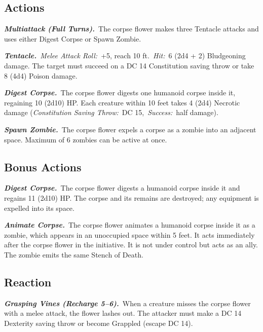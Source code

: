 \documentclass[10pt,twocolumn]{article}
\let\oldtextbf\textbf
\renewcommand{\textbf}[1]{\oldtextbf{{#1}}}
\begin{document}
\subsection{Actions}\label{actions-2}

\emph{\textbf{Multiattack (Full Turns).}}~The corpse flower makes three
Tentacle attacks and uses either Digest Corpse or Spawn Zombie.

\emph{\textbf{Tentacle.}}~\emph{Melee Attack Roll:}~+5, reach 10
ft.~\emph{Hit:}~6 (2d4 + 2) Bludgeoning damage. The target must succeed
on a DC 14 Constitution saving throw or take 8 (4d4) Poison damage.

\emph{\textbf{Digest Corpse.}}~The corpse flower digests one humanoid
corpse inside it, regaining 10 (2d10) HP. Each creature within 10 feet
takes 4 (2d4) Necrotic damage (\emph{Constitution Saving Throw:}~DC
15,~\emph{Success:}~half damage).

\emph{\textbf{Spawn Zombie.}}~The corpse flower expels a corpse as a
zombie into an adjacent space. Maximum of 6 zombies can be active at
once.

\subsection{Bonus Actions}\label{bonus-actions}

\emph{\textbf{Digest Corpse.}}~The corpse flower digests a humanoid
corpse inside it and regains 11 (2d10) HP. The corpse and its remains
are destroyed; any equipment is expelled into its space.

\emph{\textbf{Animate Corpse.}}~The corpse flower animates a humanoid
corpse inside it as a zombie, which appears in an unoccupied space
within 5 feet. It acts immediately after the corpse flower in the
initiative. It is not under control but acts as an ally. The zombie
emits the same Stench of Death.

\subsection{Reaction}\label{reaction}

\emph{\textbf{Grasping Vines (Recharge 5--6).}}~When a creature misses
the corpse flower with a melee attack, the flower lashes out. The
attacker must make a DC 14 Dexterity saving throw or become Grappled
(escape DC 14).

\endgroup

\vfill\break

\begingroup
\end{document}
